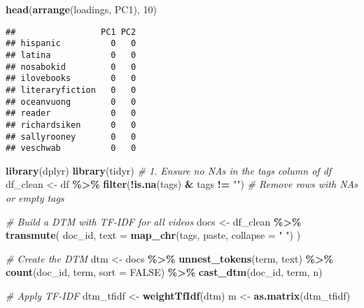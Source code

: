 \documentclass[
]{article}
\newenvironment{Shaded}{\begin{snugshade}}{\end{snugshade}}
\newcommand{\AttributeTok}[1]{\textcolor[rgb]{0.13,0.29,0.53}{#1}}
\newcommand{\CommentTok}[1]{\textcolor[rgb]{0.56,0.35,0.01}{\textit{#1}}}
\newcommand{\ConstantTok}[1]{\textcolor[rgb]{0.56,0.35,0.01}{#1}}
\newcommand{\DecValTok}[1]{\textcolor[rgb]{0.00,0.00,0.81}{#1}}
\newcommand{\FunctionTok}[1]{\textcolor[rgb]{0.13,0.29,0.53}{\textbf{#1}}}
\newcommand{\NormalTok}[1]{#1}
\newcommand{\OtherTok}[1]{\textcolor[rgb]{0.56,0.35,0.01}{#1}}
\newcommand{\SpecialCharTok}[1]{\textcolor[rgb]{0.81,0.36,0.00}{\textbf{#1}}}
\newcommand{\StringTok}[1]{\textcolor[rgb]{0.31,0.60,0.02}{#1}}
\begin{document}
\begin{Shaded}
\begin{Highlighting}[]
\FunctionTok{head}\NormalTok{(}\FunctionTok{arrange}\NormalTok{(loadings, PC1), }\DecValTok{10}\NormalTok{)}
\end{Highlighting}
\end{Shaded}

\begin{verbatim}
##                 PC1 PC2
## hispanic          0   0
## latina            0   0
## nosabokid         0   0
## ilovebooks        0   0
## literaryfiction   0   0
## oceanvuong        0   0
## reader            0   0
## richardsiken      0   0
## sallyrooney       0   0
## veschwab          0   0
\end{verbatim}

\begin{Shaded}
\begin{Highlighting}[]
\FunctionTok{library}\NormalTok{(dplyr)}
\FunctionTok{library}\NormalTok{(tidyr)}
\CommentTok{\# 1. Ensure no NAs in the \textquotesingle{}tags\textquotesingle{} column of df}
\NormalTok{df\_clean }\OtherTok{\textless{}{-}}\NormalTok{ df }\SpecialCharTok{\%\textgreater{}\%}
  \FunctionTok{filter}\NormalTok{(}\SpecialCharTok{!}\FunctionTok{is.na}\NormalTok{(tags) }\SpecialCharTok{\&}\NormalTok{ tags }\SpecialCharTok{!=} \StringTok{""}\NormalTok{)  }\CommentTok{\# Remove rows with NAs or empty tags}

\CommentTok{\# Build a DTM with TF{-}IDF for all videos}
\NormalTok{docs }\OtherTok{\textless{}{-}}\NormalTok{ df\_clean }\SpecialCharTok{\%\textgreater{}\%}
  \FunctionTok{transmute}\NormalTok{(}
\NormalTok{    doc\_id,}
    \AttributeTok{text =} \FunctionTok{map\_chr}\NormalTok{(tags, paste, }\AttributeTok{collapse =} \StringTok{" "}\NormalTok{)}
\NormalTok{  )}

\CommentTok{\# Create the DTM}
\NormalTok{dtm }\OtherTok{\textless{}{-}}\NormalTok{ docs }\SpecialCharTok{\%\textgreater{}\%}
  \FunctionTok{unnest\_tokens}\NormalTok{(term, text) }\SpecialCharTok{\%\textgreater{}\%}
  \FunctionTok{count}\NormalTok{(doc\_id, term, }\AttributeTok{sort =} \ConstantTok{FALSE}\NormalTok{) }\SpecialCharTok{\%\textgreater{}\%}
  \FunctionTok{cast\_dtm}\NormalTok{(doc\_id, term, n)}

\CommentTok{\# Apply TF{-}IDF}
\NormalTok{dtm\_tfidf }\OtherTok{\textless{}{-}} \FunctionTok{weightTfIdf}\NormalTok{(dtm)}
\NormalTok{m }\OtherTok{\textless{}{-}} \FunctionTok{as.matrix}\NormalTok{(dtm\_tfidf)}


\end{Highlighting}
\end{Shaded}
\end{document}
